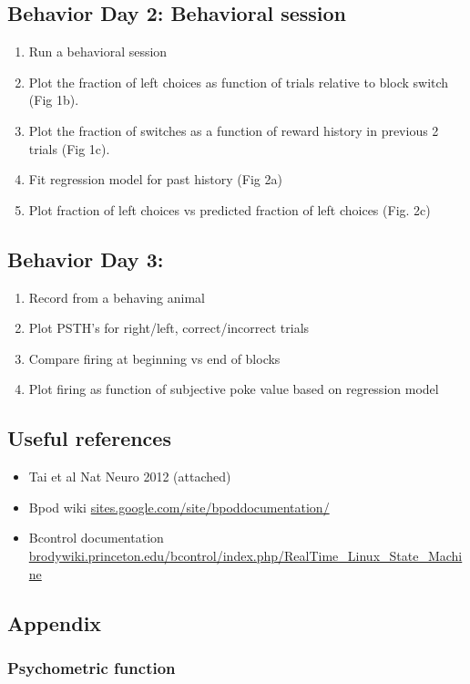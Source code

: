 \documentclass[a4paper]{report}
\begin{document}
\subsection*{Behavior Day 2: Behavioral session}
\begin{enumerate}
\item Run a behavioral session
\item Plot the fraction of left choices as function of trials relative to block switch (Fig 1b).
\item Plot the fraction of switches as a function of reward history in previous 2 trials (Fig 1c).
\item Fit regression model for past history (Fig 2a)
\item Plot fraction of left choices vs predicted fraction of left choices (Fig. 2c)
\end{enumerate}

\subsection*{Behavior Day 3:}
\begin{enumerate}
\item Record from a behaving animal
\item Plot PSTH's for right/left, correct/incorrect trials
\item Compare firing at beginning vs end of blocks
\item Plot firing as function of subjective poke value based on regression model
\end{enumerate}


\subsection*{Useful references}
\begin{itemize}
\item Tai et al Nat Neuro 2012 (attached)
\item Bpod wiki \url{sites.google.com/site/bpoddocumentation/}
\item Bcontrol documentation \url{brodywiki.princeton.edu/bcontrol/index.php/RealTime_Linux_State_Machine}
\end{itemize}


\subsection*{Appendix}

\subsubsection{Psychometric function}
\end{document}
